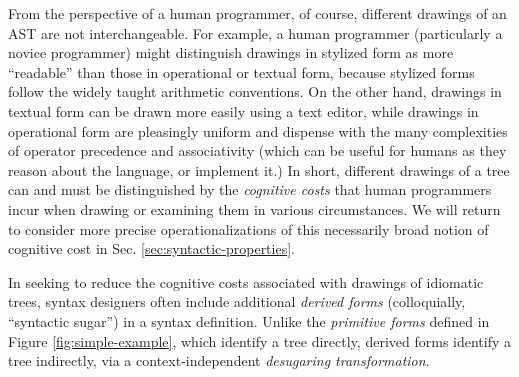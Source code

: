 From the perspective of a human programmer, of course, different drawings of an AST are not interchangeable. For example, a human programmer (particularly a novice programmer) might distinguish drawings in stylized form as more ``readable'' than those in operational or textual form, because stylized forms follow the widely taught arithmetic conventions. On the other hand, drawings in textual form can be drawn more easily using a text editor, while drawings in operational form are pleasingly uniform and dispense with the many complexities of operator precedence and associativity (which can be useful for humans as they reason  about the language, or implement it.) %
In short, different drawings of a tree can and must be distinguished by the \emph{cognitive costs}  that human programmers incur when drawing or examining them in various circumstances. We will return to consider more precise operationalizations of this necessarily broad notion of cognitive cost in Sec. \ref{sec:syntactic-properties}. %

In seeking to reduce the cognitive costs associated with drawings of idiomatic trees, syntax designers  often  include additional \emph{derived forms} (colloquially, ``syntactic sugar'') in a syntax definition. Unlike the \emph{primitive forms} defined in Figure \ref{fig:simple-example}, which identify a tree directly, derived forms identify a tree indirectly, via a context-independent \emph{desugaring transformation}.

